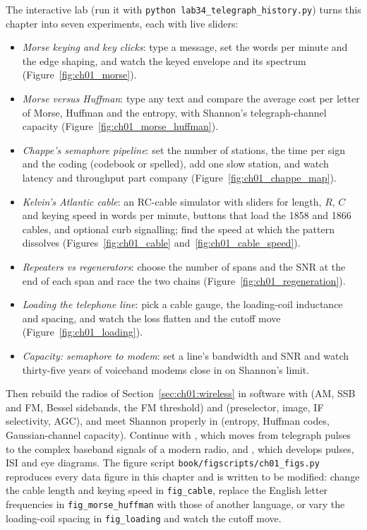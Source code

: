 \begin{labbox}
The interactive lab  (run it with
\texttt{python lab34\_telegraph\_history.py}) turns this chapter into seven experiments, each with live
sliders:
\begin{itemize}
\item \emph{Morse keying and key clicks}: type a message, set the words per minute and the edge
shaping, and watch the keyed envelope and its spectrum (Figure~\ref{fig:ch01_morse}).
\item \emph{Morse versus Huffman}: type any text and compare the average cost per letter of Morse,
Huffman and the entropy, with Shannon's telegraph-channel capacity (Figure~\ref{fig:ch01_morse_huffman}).
\item \emph{Chappe's semaphore pipeline}: set the number of stations, the time per sign and the coding
(codebook or spelled), add one slow station, and watch latency and throughput part company
(Figure~\ref{fig:ch01_chappe_map}).
\item \emph{Kelvin's Atlantic cable}: an RC-cable simulator with sliders for length, $R$, $C$ and
keying speed in words per minute, buttons that load the 1858 and 1866 cables, and optional curb
signalling; find the speed at which the pattern dissolves
(Figures~\ref{fig:ch01_cable} and~\ref{fig:ch01_cable_speed}).
\item \emph{Repeaters vs regenerators}: choose the number of spans and the SNR at the end of each span and
race the two chains (Figure~\ref{fig:ch01_regeneration}).
\item \emph{Loading the telephone line}: pick a cable gauge, the loading-coil inductance and spacing, and
watch the loss flatten and the cutoff move (Figure~\ref{fig:ch01_loading}).
\item \emph{Capacity: semaphore to modem}: set a line's bandwidth and SNR and watch thirty-five years
of voiceband modems close in on Shannon's limit.
\end{itemize}
Then rebuild the radios of Section~\ref{sec:ch01:wireless} in software with
 (AM, SSB and FM, Bessel sidebands, the FM threshold) and
 (preselector, image, IF selectivity, AGC), and meet Shannon properly in
 (entropy, Huffman codes, Gaussian-channel capacity). Continue with
, which moves from telegraph pulses to the complex baseband signals of a modern
radio, and , which develops pulses, ISI and eye diagrams. The figure
script \texttt{book/figscripts/ch01\_figs.py} reproduces every data figure in this chapter and is written
to be modified: change the cable length and keying speed in \texttt{fig\_cable}, replace the English
letter frequencies in \texttt{fig\_morse\_huffman} with those of another language, or vary the
loading-coil spacing in \texttt{fig\_loading} and watch the cutoff move.
\end{labbox}

